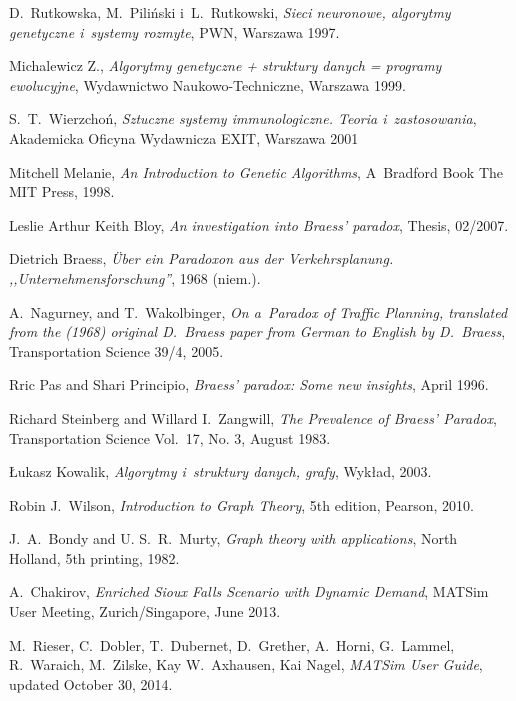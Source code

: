 \documentclass[twoside,12pt]{report}
\renewcommand{\bibname}{Bibliografia}
\begin{document}
\addcontentsline{toc}{chapter}{\bibname} 
\begin{thebibliography}{99}

	D.~Rutkowska, M.~Piliński i~L.~Rutkowski,
	\textit{Sieci neuronowe, algorytmy genetyczne i~systemy rozmyte},
	PWN, Warszawa 1997.
	
	Michalewicz Z., 
	\textit{Algorytmy genetyczne + struktury danych = programy ewolucyjne}, 
	Wydawnictwo Naukowo-Techniczne, Warszawa 1999.
	
	S.~T.~Wierzchoń, 
	\textit{Sztuczne systemy immunologiczne. Teoria i~zastosowania},
	Akademicka Oficyna Wydawnicza EXIT, Warszawa 2001

	Mitchell Melanie,
	\textit{An Introduction to Genetic Algorithms},
	A~Bradford Book The MIT Press, 1998.	
	
	Leslie Arthur Keith Bloy, 
	\textit{An investigation into Braess’ paradox}, 
	Thesis, 02/2007.

	Dietrich Braess,
	\textit{Über ein Paradoxon aus der Verkehrsplanung. ,,Unternehmensforschung''},
	1968 (niem.).
	
	A.~Nagurney, and T.~Wakolbinger,
	\textit{On a~Paradox of Traffic Planning, translated from the (1968) original D.~Braess paper from German to English by D.~Braess},
	Transportation Science 39/4, 2005.

	Rric Pas and Shari Principio,
	\textit{Braess’ paradox: Some new insights}, 
	April 1996.
	
	Richard Steinberg and Willard I.~Zangwill,
	\textit{The Prevalence of Braess' Paradox},
	Transportation Science Vol.~17, No. 3, August 1983. 

	Łukasz Kowalik,
	\textit{Algorytmy i~struktury danych, grafy},
	Wykład, 2003.
	
	Robin J.~Wilson,
	\textit{Introduction to Graph Theory},
	5th edition, Pearson, 2010.
	
	J.~A.~Bondy and U. S.~R.~Murty,
	\textit{Graph theory with applications},
	North Holland, 5th printing, 1982.
	
	A.~Chakirov,
	\textit{Enriched Sioux Falls Scenario with Dynamic Demand},
	MATSim User Meeting, Zurich/Singapore, June 2013.
		
	M.~Rieser, C.~Dobler, T.~Dubernet, D.~Grether, A.~Horni, G.~Lammel, R.~Waraich, M.~Zilske, Kay W.~Axhausen, Kai Nagel,
	\textit{MATSim User Guide},
	updated October 30, 2014.


\end{thebibliography}
\end{document}
